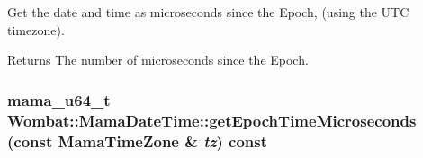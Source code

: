 Get the date and time as microseconds since the Epoch, (using the UTC timezone). \begin{DoxyReturn}{Returns}
The number of microseconds since the Epoch. 
\end{DoxyReturn}
\hypertarget{classWombat_1_1MamaDateTime_ad083a6993f7bbe2f0c5c43e7d7782bf3}{
\subsubsection[{getEpochTimeMicroseconds}]{\setlength{\rightskip}{0pt plus 5cm}mama\_\-u64\_\-t Wombat::MamaDateTime::getEpochTimeMicroseconds (const {\bf MamaTimeZone} \& {\em tz}) const}}
\label{classWombat_1_1MamaDateTime_ad083a6993f7bbe2f0c5c43e7d7782bf3}


